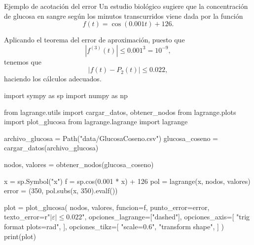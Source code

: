 \begin{frame}[fragile]{Ejemplo de acotación del error}
  Un estudio biológico sugiere que la concentración de glucosa en sangre
  según los minutos transcurridos viene dada por la función
  \[
    f(t) = \cos(0.001t) + 126.
  \]

  \begin{multicols}{2}
    Aplicando el teorema del error de aproximación, puesto que
    \[
      \left\lvert f^{(3)}(t) \right\rvert \le 0.001^3 = 10^{-9},
    \]
    tenemos que
    \[
      \left\lvert f(t) - P_2(t) \right\rvert \le 0.022,
    \]
    haciendo los cálculos adecuados.

    \columnbreak

    \begin{pycode}
      import sympy as sp
      import numpy as np
  
      from lagrange.utils import cargar_datos, obtener_nodos
      from lagrange.plots import plot_glucosa
      from lagrange.lagrange import lagrange
  
      archivo_glucosa = Path("data/GlucosaCoseno.csv")
      glucosa_coseno = cargar_datos(archivo_glucosa)
  
      nodos, valores = obtener_nodos(glucosa_coseno)
  
      x = sp.Symbol("x")
      f = sp.cos(0.001 * x) + 126
      pol = lagrange(x, nodos, valores)
      error = (350, pol.subs(x, 350).evalf())
  
      plot = plot_glucosa(
        nodos,
        valores,
        funcion=f,
        punto_error=error,
        texto_error=r"$\left\lvert \varepsilon \right\rvert \le 0.022$",
        opciones_lagrange=["dashed"],
        opciones_axis=[
          "trig format plots=rad",
        ],
        opciones_tikz=[
          "scale=0.6",
          "transform shape",
        ]
      )
      print(plot)
    \end{pycode}
  \end{multicols}
\end{frame}
